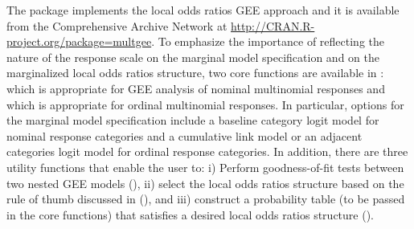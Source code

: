 \documentclass[article,shortnames,nojss]{jss}
\begin{document}
The  \citep{RCoreTeam2013} package  implements the local odds ratios GEE approach and it is available from the Comprehensive  Archive Network at \url{http://CRAN.R-project.org/package=multgee}. To emphasize the importance of reflecting the nature of the response scale on the marginal model specification and on the marginalized local odds ratios structure, two core functions are available in :  which is appropriate for GEE analysis of nominal multinomial responses and  which is appropriate for ordinal multinomial responses. In particular, options for the marginal model specification include a baseline category logit model for nominal response categories and a cumulative link model or an adjacent categories logit model for ordinal response categories. In addition, there are three utility functions that enable the user to: i) Perform goodness-of-fit tests between two nested GEE models (), ii) select the local odds ratios structure based on the rule of thumb discussed in \cite{Touloumis2012} (), and iii) construct a probability table (to be passed in the core functions) that satisfies a desired local odds ratios structure ().
\end{document}
